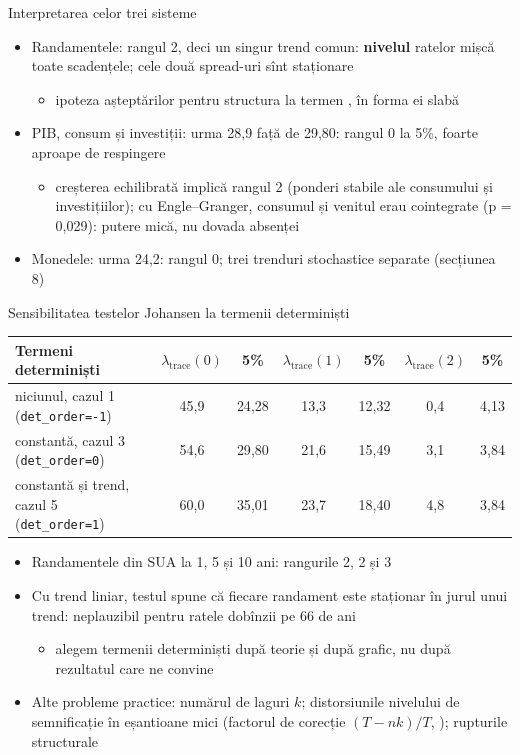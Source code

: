 \begin{frame}{Interpretarea celor trei sisteme}
\itemsize{\small}
\begin{itemize}
    \item Randamentele: rangul 2, deci un singur trend comun: \textbf{nivelul} ratelor mișcă toate scadențele; cele două spread-uri sînt staționare
    \begin{itemize}
        \item ipoteza așteptărilor pentru structura la termen , în forma ei slabă
    \end{itemize}
    \item PIB, consum și investiții: urma 28{,}9 față de 29{,}80: rangul 0 la 5\%, foarte aproape de respingere
    \begin{itemize}
        \item creșterea echilibrată implică rangul 2 (ponderi stabile ale consumului și investițiilor); cu Engle--Granger, consumul și venitul erau cointegrate (p = 0{,}029): putere mică, nu dovada absenței
    \end{itemize}
    \item Monedele: urma 24{,}2: rangul 0; trei trenduri stochastice separate (secțiunea 8)
\end{itemize}
\end{frame}

\begin{frame}{Sensibilitatea testelor Johansen la termenii determiniști}
\itemsize{\small}
\begin{center}
\scriptsize
\begin{tabular}{lcccccc}
\toprule
\textbf{Termeni determiniști} & $\lambda_{\mathrm{trace}}(0)$ & 5\% & $\lambda_{\mathrm{trace}}(1)$ & 5\% & $\lambda_{\mathrm{trace}}(2)$ & 5\% \\
\midrule
niciunul, cazul 1 (\texttt{det\_order=-1}) & 45{,}9 & 24{,}28 & 13{,}3 & 12{,}32 & 0{,}4 & 4{,}13 \\
constantă, cazul 3 (\texttt{det\_order=0}) & 54{,}6 & 29{,}80 & 21{,}6 & 15{,}49 & 3{,}1 & 3{,}84 \\
constantă și trend, cazul 5 (\texttt{det\_order=1}) & 60{,}0 & 35{,}01 & 23{,}7 & 18{,}40 & 4{,}8 & 3{,}84 \\
\bottomrule
\end{tabular}
\end{center}
\begin{itemize}
    \item Randamentele din SUA la 1, 5 și 10 ani: rangurile 2, 2 și 3
    \item Cu trend liniar, testul spune că fiecare randament este staționar în jurul unui trend: neplauzibil pentru ratele dobînzii pe 66 de ani
    \begin{itemize}
        \item alegem termenii determiniști după teorie și după grafic, nu după rezultatul care ne convine
    \end{itemize}
    \item Alte probleme practice: numărul de laguri $k$; distorsiunile nivelului de semnificație în eșantioane mici (factorul de corecție $(T - nk)/T$, ); rupturile structurale
\end{itemize}
\end{frame}


